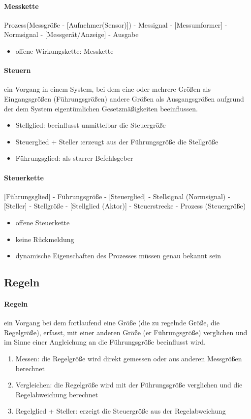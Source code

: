 \documentclass[a4paper]{scrartcl}
\begin{document}
\paragraph{Messkette} Prozess(Messgröße - [Aufnehmer(Sensor)]) - Messignal - [Messumformer] - Normsignal - [Messgerät/Anzeige] - Ausgabe

\begin{itemize}
\item offene Wirkungskette: Messkette
\end{itemize}

\paragraph{Steuern} ein Vorgang in einem System, bei dem eine oder mehrere Größen als Eingangsgrößen (Führungsgrößen) andere Größen als Ausgangsgrößen aufgrund der dem System eigentümlichen Gesetzmäßigkeiten beeinflussen.
\begin{itemize}
\item Stellglied: beeinflusst unmittelbar die Steuergröße
\item Steuerglied + Steller :erzeugt aus der Führungsgröße die Stellgröße
\item Führungsglied: als starrer Befehlsgeber
\end{itemize}

\paragraph{Steuerkette} [Führungsglied] - Führungsgröße - [Steuerglied] - Stellsignal (Normsignal) - [Steller] - Stellgröße - [Stellglied (Aktor)] - Steuerstrecke - Prozess (Steuergröße)

\begin{itemize}
\item offene Steuerkette
\item keine Rückmeldung
\item dynamische Eigenschaften des Prozesses müssen genau bekannt sein
\end{itemize}

\subsection{Regeln}
\paragraph{Regeln} ein Vorgang bei dem fortlaufend eine Größe (die zu regelnde Größe, die Regelgröße), erfasst, mit einer anderen Größe (er Führungsgröße) verglichen und im Sinne einer Angleichung an die Führungsgröße beeinflusst wird.
\begin{enumerate}
\item Messen: die Regelgröße wird direkt gemessen oder aus anderen Messgrößen berechnet
\item Vergleichen: die Regelgröße wird mit der Führungsgröße verglichen und die Regelabweichung berechnet
\item Regelglied + Steller: erzeigt die Steuergröße aus der Regelabweichung
\end{enumerate}
\end{document}

